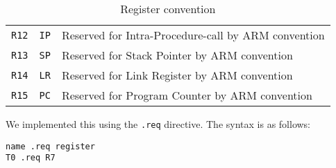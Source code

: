 \begin{table}[h!]
\begin{tabular}{l | l | l}
        \texttt{R12}    & \texttt{IP}      & Reserved for Intra-Procedure-call by ARM convention\\
        \texttt{R13}    & \texttt{SP}      & Reserved for Stack Pointer by ARM convention       \\
        \texttt{R14}    & \texttt{LR}      & Reserved for Link Register by ARM convention       \\
        \texttt{R15}    & \texttt{PC}      & Reserved for Program Counter by ARM convention     \\
    \end{tabular}
    \caption{Register convention}
\end{table}

We implemented this using the \texttt{.req} directive. The syntax is as follows:

\begin{lstlisting}[label=register-aliasing,caption=Register aliasing]
name .req register
T0 .req R7
\end{lstlisting}
